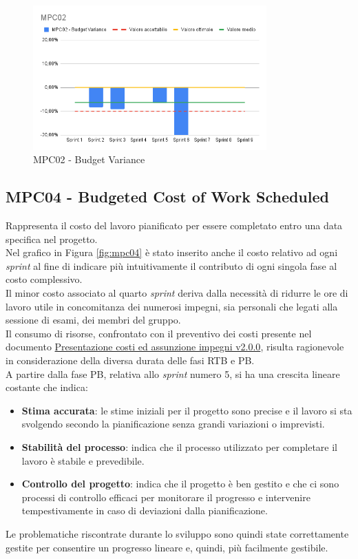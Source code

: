 \begin{figure}[htbp]
    \centering
    \includegraphics[width=0.8\textwidth]{img/MPC02.png}
    \caption{MPC02 - Budget Variance}
    \label{fig:mpc02}
\end{figure}


\newpage

\subsection{MPC04 - Budgeted Cost of Work Scheduled}
\label{s:mpc04}
Rappresenta il costo del lavoro pianificato per essere completato entro una data specifica nel progetto.\\
Nel grafico in Figura \ref{fig:mpc04} è stato inserito anche il costo relativo ad ogni \textit{sprint} al fine di indicare più intuitivamente il contributo di ogni singola fase al costo complessivo.\\
Il minor costo associato al quarto \textit{sprint} deriva dalla necessità di ridurre le ore di lavoro utile in concomitanza dei numerosi impegni, sia personali che legati alla sessione di esami, dei membri del gruppo.\\
Il consumo di risorse, confrontato con il preventivo dei costi presente nel documento \href{https://project-swenergy.github.io/Candidatura/Presentazione%20costi%20e%20assunzione%20impegni.pdf}{Presentazione costi ed assunzione impegni v2.0.0}, risulta ragionevole in considerazione della diversa durata delle fasi RTB e PB.\\
A partire dalla fase PB, relativa allo \textit{sprint} numero 5, si ha una crescita lineare costante che indica:
\begin{itemize}
    \item \textbf{Stima accurata}: le stime iniziali per il progetto sono precise e il lavoro si sta svolgendo secondo la pianificazione senza grandi variazioni o imprevisti.
    \item \textbf{Stabilità del processo}: indica che il processo utilizzato per completare il lavoro è stabile e prevedibile.
    \item \textbf{Controllo del progetto}: indica che il progetto è ben gestito e che ci sono processi di controllo efficaci per monitorare il progresso e intervenire tempestivamente in caso di deviazioni dalla pianificazione.
\end{itemize}
Le problematiche riscontrate durante lo sviluppo sono quindi state correttamente gestite per consentire un progresso lineare e, quindi, più facilmente gestibile.

